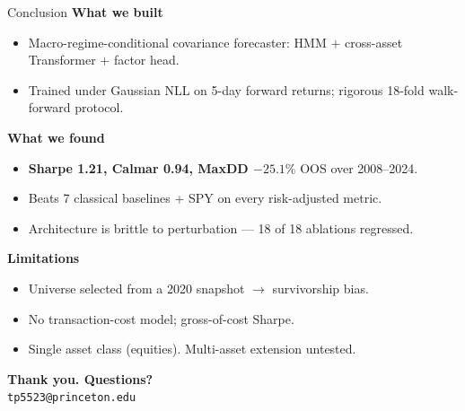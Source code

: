 \documentclass[10pt, aspectratio=169]{beamer}
\begin{document}
\begin{frame}{Conclusion}
\textbf{What we built}
\begin{itemize}\setlength{\itemsep}{2pt}
  \item Macro-regime-conditional covariance forecaster: HMM $+$ cross-asset Transformer $+$ factor head.
  \item Trained under Gaussian NLL on 5-day forward returns; rigorous 18-fold walk-forward protocol.
\end{itemize}
\textbf{What we found}
\begin{itemize}\setlength{\itemsep}{2pt}
  \item \textbf{Sharpe 1.21, Calmar 0.94, MaxDD $-25.1\%$} OOS over 2008--2024.
  \item Beats 7 classical baselines + SPY on every risk-adjusted metric.
  \item Architecture is brittle to perturbation --- 18 of 18 ablations regressed.
\end{itemize}
\textbf{Limitations}
\begin{itemize}\setlength{\itemsep}{2pt}\footnotesize
  \item Universe selected from a 2020 snapshot $\to$ survivorship bias.
  \item No transaction-cost model; gross-of-cost Sharpe.
  \item Single asset class (equities). Multi-asset extension untested.
\end{itemize}
\vspace{0.4em}
\begin{center}
\textbf{Thank you. Questions?}\\
\footnotesize \texttt{tp5523@princeton.edu}
\end{center}
\end{frame}
\end{document}
